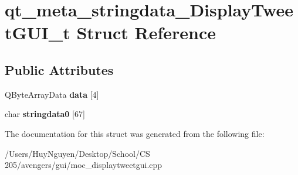 \hypertarget{structqt__meta__stringdata__DisplayTweetGUI__t}{}\section{qt\+\_\+meta\+\_\+stringdata\+\_\+\+Display\+Tweet\+G\+U\+I\+\_\+t Struct Reference}
\label{structqt__meta__stringdata__DisplayTweetGUI__t}
\subsection*{Public Attributes}
\begin{DoxyCompactItemize}
\item 
Q\+Byte\+Array\+Data {\bfseries data} \mbox{[}4\mbox{]}\hypertarget{structqt__meta__stringdata__DisplayTweetGUI__t_a271752cbac96b9bc6ef48d40984c13b4}{}\label{structqt__meta__stringdata__DisplayTweetGUI__t_a271752cbac96b9bc6ef48d40984c13b4}

\item 
char {\bfseries stringdata0} \mbox{[}67\mbox{]}\hypertarget{structqt__meta__stringdata__DisplayTweetGUI__t_a3671bd194af71609f48b1e710624929c}{}\label{structqt__meta__stringdata__DisplayTweetGUI__t_a3671bd194af71609f48b1e710624929c}

\end{DoxyCompactItemize}


The documentation for this struct was generated from the following file\+:\begin{DoxyCompactItemize}
\item 
/\+Users/\+Huy\+Nguyen/\+Desktop/\+School/\+C\+S 205/avengers/gui/moc\+\_\+displaytweetgui.\+cpp\end{DoxyCompactItemize}
